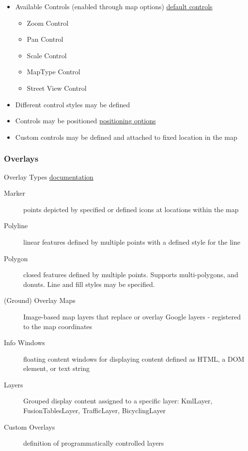 \documentclass[]{article}
\begin{document}
\begin{itemize}
\itemsep1pt\parskip0pt
\item
  Available Controls (enabled through map options)
  \href{http://tinyurl.com/nryup5j}{default controls}

  \begin{itemize}
  \itemsep1pt\parskip0pt
  \item
    Zoom Control
  \item
    Pan Control
  \item
    Scale Control
  \item
    MapType Control
  \item
    Street View Control
  \end{itemize}
\item
  Different control styles may be defined
\item
  Controls may be positioned
  \href{http://tinyurl.com/p3hc5gk}{positioning options}
\item
  Custom controls may be defined and attached to fixed location in the
  map
\end{itemize}

\subsubsection{Overlays}\label{overlays}

Overlay Types
\href{http://code.google.com/apis/maps/documentation/javascript/overlays.html}{documentation}

\begin{description}
\item[Marker]
points depicted by specified or defined icons at locations within the
map
\item[Polyline]
linear features defined by multiple points with a defined style for the
line
\item[Polygon]
closed features defined by multiple points. Supports multi-polygons, and
donuts. Line and fill styles may be specified.
\item[(Ground) Overlay Maps]
Image-based map layers that replace or overlay Google layers -
registered to the map coordinates
\item[Info Windows]
floating content windows for displaying content defined as HTML, a DOM
element, or text string
\item[Layers]
Grouped display content assigned to a specific layer: KmlLayer,
FusionTablesLayer, TrafficLayer, BicyclingLayer
\item[Custom Overlays]
definition of programmatically controlled layers
\end{description}
\end{document}

